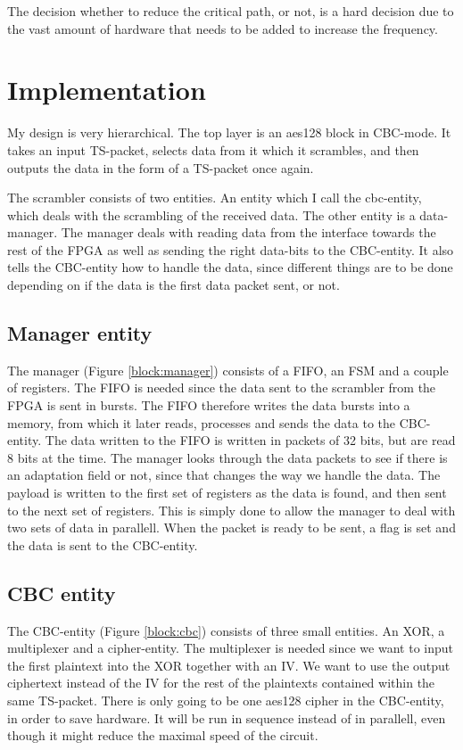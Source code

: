 The decision whether to reduce the critical path, or not, is a hard 
decision due to the vast amount of hardware that needs to be added to
increase the frequency.

\section{Implementation}
My design is very hierarchical. The top layer is an aes128 block in 
CBC-mode. It takes an input TS-packet, selects data from it which it 
scrambles, and then outputs the data in the form of a TS-packet once 
again.

The scrambler consists of two entities. An entity which I call the 
cbc-entity, which deals with the scrambling of the received data. The 
other entity is a data-manager. The manager deals with reading data 
from the interface towards the rest of the FPGA as well as sending the 
right data-bits to the CBC-entity. It also tells the CBC-entity how to 
handle the data, since different things are to be done depending on if 
the data is the first data packet sent, or not.

\subsection{Manager entity}
The manager (Figure \ref{block:manager}) consists of a FIFO, an FSM and 
a couple of registers. The FIFO is needed since the data sent to the 
scrambler from the FPGA is sent in bursts. The FIFO therefore writes 
the data bursts into a memory, from which it later reads, processes and 
sends the data to the CBC-entity. The data written to the FIFO is 
written in packets of 32 bits, but are read 8 bits at the time. The 
manager looks through the data packets to see if there is an adaptation 
field or not, since that changes the way we handle the data. The 
payload is written to the first set of registers as the data is found, 
and then sent to the next set of registers. This is simply done to 
allow the manager to deal with two sets of data in parallell. When the 
packet is ready to be sent, a flag is set and the data is sent to the 
CBC-entity. 

\subsection{CBC entity}
The CBC-entity (Figure \ref{block:cbc}) consists of three small 
entities. An XOR, a multiplexer and a cipher-entity. The multiplexer is 
needed since we want to input the first plaintext into the XOR together 
with an IV. We want to use the output ciphertext instead of the IV for 
the rest of the plaintexts contained within the same TS-packet. There 
is only going to be one aes128 cipher in the CBC-entity, in order to 
save hardware. It will be run in sequence instead of in parallell, even 
though it might reduce the maximal speed of the circuit.

